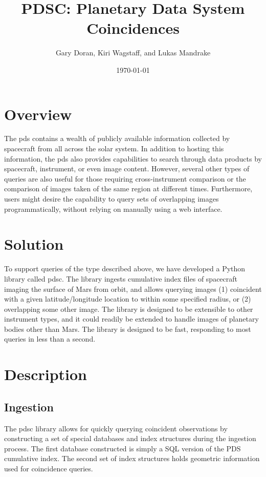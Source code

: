 \documentclass[twocolumn]{extarticle}
\title{
  PDSC: Planetary Data System Coincidences
}
\author{Gary Doran, Kiri Wagstaff, and Lukas Mandrake}
\date{\today}
\begin{document}
\maketitle

\section*{Overview}
The \ac{pds} contains a wealth of publicly available information collected by
spacecraft from all across the solar system. In addition to hosting this
information, the \ac{pds} also provides capabilities to search through data
products by spacecraft, instrument, or even image content. However, several
other types of queries are also useful for those requiring cross-instrument
comparison or the comparison of images taken of the same region at different
times. Furthermore, users might desire the capability to query sets of
overlapping images programmatically, without relying on manually using a web
interface.

\section*{Solution}
To support queries of the type described above, we have developed a Python
library called \ac{pdsc}. The library ingests cumulative index files of
spacecraft imaging the surface of Mars from orbit, and allows querying images
(1) coincident with a given latitude/longitude location to within some
specified radius, or (2) overlapping some other image. The library is designed
to be extensible to other instrument types, and it could readily be extended to
handle images of planetary bodies other than Mars. The library is designed to
be fast, responding to most queries in less than a second.

\section*{Description}

\subsection*{Ingestion}
The \ac{pdsc} library allows for quickly querying coincident observations by
constructing a set of special databases and index structures during the
ingestion process. The first database constructed is simply a SQL version of the
PDS cumulative index. The second set of index structures holds geometric
information used for coincidence queries.
\end{document}
